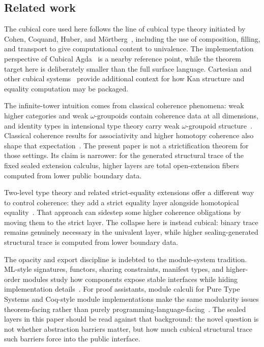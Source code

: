 \documentclass{lmcs}
\begin{document}
\subsection{Related work}
\label{subsec:related-work}

The cubical core used here follows the line of cubical type theory initiated by
Cohen, Coquand, Huber, and M{\"o}rtberg~\cite{cubical}, including the use of
composition, filling, and transport to give computational content to
univalence.  The implementation perspective of Cubical Agda~\cite{cubical-agda}
is a nearby reference point, while the theorem target here is deliberately
smaller than the full surface language.  Cartesian and other cubical
systems~\cite{cartesian-cubical,xtt} provide additional context for how Kan
structure and equality computation may be packaged.

The infinite-tower intuition comes from classical coherence phenomena:
weak higher categories and weak \(\omega\)-groupoids contain coherence data at
all dimensions, and identity types in intensional type theory carry weak
\(\omega\)-groupoid structure~\cite{lumsdaine,vdberg-garner}.  Classical
coherence results for associativity and higher homotopy coherence also shape
that expectation~\cite{maclane-coherence,stasheff-i,stasheff-ii,kraus-vonraumer}.
The present paper is not a strictification theorem for those settings.  Its
claim is narrower: for the generated structural trace of the fixed sealed
extension calculus, higher layers are total open-extension fibers computed from
lower public boundary data.

Two-level type theory and related strict-equality extensions offer a different
way to control coherence: they add a strict equality layer alongside homotopical
equality~\cite{altenkirch-strict,annenkov-2ltt}.  That approach can sidestep
some higher coherence obligations by moving them to the strict layer.  The
collapse here is instead cubical: binary trace remains genuinely necessary in
the univalent layer, while higher sealing-generated structural trace is computed
from lower boundary data.

The opacity and export discipline is indebted to the module-system tradition.
ML-style signatures, functors, sharing constraints, manifest types, and
higher-order modules study how components expose stable interfaces while hiding
implementation details~\cite{macqueen-modules,harper-lillibridge,leroy-manifest,dreyer-higher-modules}.
For proof assistants, module calculi for Pure Type Systems and Coq-style module
implementations make the same modularity issues theorem-facing rather than
purely programming-language-facing~\cite{courant-pts-modules,chrzaszcz-coq-modules,filliatre-letouzey}.
The sealed layers in this paper should be read against that background: the
novel question is not whether abstraction barriers matter, but how much cubical
structural trace such barriers force into the public interface.
\end{document}
